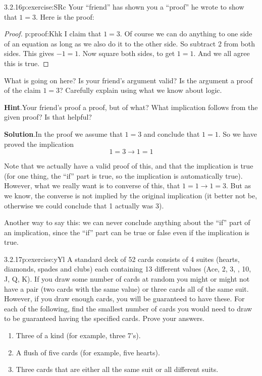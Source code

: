 \documentclass[twoside,11pt,]{book}
\newcommand{\blocktitlefont}{\relax}
\numberwithin{equation}{chapter}
\newcommand{\imp}{\rightarrow}
\begin{document}
\begin{divisionsolution}{3.2.16}{}{p:exercise:SRc}%
Your ``friend'' has shown you a ``proof'' he wrote to show that \(1 = 3\). Here is the proof:%
\begin{proof}{}{p:proof:Khk}
I claim that \(1 = 3\). Of course we can do anything to one side of an equation as long as we also do it to the other side. So subtract 2 from both sides. This gives \(-1 = 1\). Now square both sides, to get \(1 = 1\). And we all agree this is true.%
\end{proof}
What is going on here? Is your friend's argument valid? Is the argument a proof of the claim \(1=3\)? Carefully explain using what we know about logic.%
\par\smallskip%
\noindent\textbf{\blocktitlefont Hint}.\quad{}Your friend's proof a proof, but of what?  What implication follows from the given proof?  Is that helpful?%
\par\smallskip%
\noindent\textbf{\blocktitlefont Solution}.\quad{}In the proof we assume that \(1=3\) and conclude that \(1=1\). So we have proved the implication%
\begin{equation*}
1=3 \imp 1=1
\end{equation*}
%
\par
Note that we actually have a valid proof of this, and that the implication is true (for one thing, the ``if'' part is true, so the implication is automatically true). However, what we really want is to converse of this, that \(1=1 \imp 1=3\). But as we know, the converse is not implied by the original implication (it better not be, otherwise we could conclude that 1 actually was 3).%
\par
Another way to say this: we can never conclude anything about the ``if'' part of an implication, since the ``if'' part can be true or false even if the implication is true.%
\end{divisionsolution}%
\begin{divisionsolution}{3.2.17}{}{p:exercise:yYl}%
A standard deck of 52 cards consists of 4 suites (hearts, diamonds, spades and clubs) each containing 13 different values (Ace, 2, 3, \textellipsis{}, 10, J, Q, K). If you draw some number of cards at random you might or might not have a pair (two cards with the same value) or three cards all of the same suit. However, if you draw enough cards, you will be guaranteed to have these. For each of the following, find the smallest number of cards you would need to draw to be guaranteed having the specified cards. Prove your answers.%
\begin{enumerate}[label=(\alph*)]
\item{}Three of a kind (for example, three 7's).%
\item{}A flush of five cards (for example, five hearts).%
\item{}Three cards that are either all the same suit or all different suits. %
\end{enumerate}
%
\end{divisionsolution}%
\end{document}

